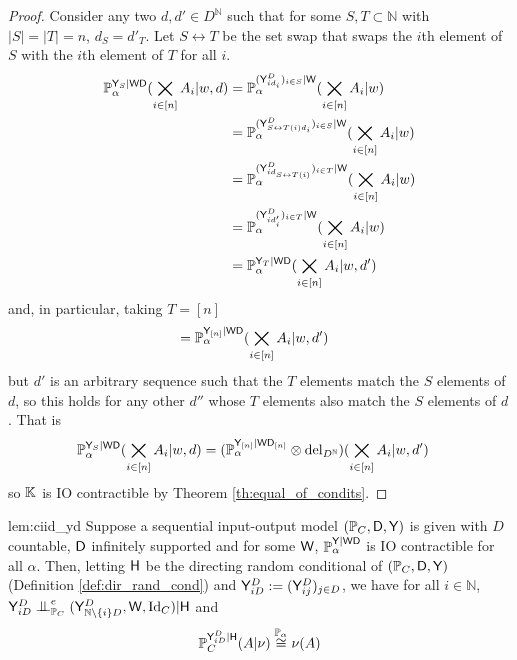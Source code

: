 \begin{proof}
Consider any two $d,d'\in D^{\mathbb{N}}$ such that for some $S,T\subset\mathbb{N}$ with $|S|=|T|=n$, $d_S=d'_T$. Let $S\leftrightarrow T$ be the set swap that swaps the $i$th element of $S$ with the $i$th element of $T$ for all $i$.
\begin{align}
    \mathbb{P}_\alpha^{\mathsf{Y}_S|\mathsf{WD}}(\bigtimes_{i\in [n]} A_i|w,d) &= \mathbb{P}_\alpha^{(\mathsf{Y}^D_{i d_i})_{i\in S}|\mathsf{W}} (\bigtimes_{i\in [n]} A_i|w)\\
    &= \mathbb{P}_\alpha^{(\mathsf{Y}^D_{S\leftrightarrow T(i) d_i})_{i\in S}|\mathsf{W}} (\bigtimes_{i\in [n]} A_i|w)\\
    &= \mathbb{P}_\alpha^{(\mathsf{Y}^D_{i d_{S\leftrightarrow T(i)}})_{i\in T}|\mathsf{W}} (\bigtimes_{i\in [n]} A_i|w)\\
    &= \mathbb{P}_\alpha^{(\mathsf{Y}^D_{i d'_{i}})_{i\in T}|\mathsf{W}} (\bigtimes_{i\in [n]} A_i|w)\\
    &=  \mathbb{P}_\alpha^{\mathsf{Y}_T|\mathsf{WD}}(\bigtimes_{i\in [n]} A_i|w,d')
\end{align}
and, in particular, taking $T=[n]$
\begin{align}
    &= \mathbb{P}_\alpha^{\mathsf{Y}_{[n]}|\mathsf{WD}} (\bigtimes_{i\in [n]} A_i|w,d')
\end{align}
but $d'$ is an arbitrary sequence such that the $T$ elements match the $S$ elements of $d$, so this holds for any other $d''$ whose $T$ elements also match the $S$ elements of $d$. That is
\begin{align}
    \mathbb{P}_\alpha^{\mathsf{Y}_S|\mathsf{WD}}(\bigtimes_{i\in [n]} A_i|w,d)&= (\mathbb{P}_\alpha^{\mathsf{Y}_{[n]}|\mathsf{WD}_{[n]}}\otimes \mathrm{del}_{D^{\mathbb{N}}}) (\bigtimes_{i\in [n]} A_i|w,d')
\end{align}
so $\mathbb{K}$ is IO contractible by Theorem \ref{th:equal_of_condits}.
\end{proof}

\begin{replemma}{lem:ciid_yd}
Suppose a sequential input-output model $(\mathbb{P}_C,\mathsf{D},\mathsf{Y})$ is given with $D$ countable, $\mathsf{D}$ infinitely supported and for some $\mathsf{W}$, $\mathbb{P}_\alpha^{\mathsf{Y}|\mathsf{WD}}$ is IO contractible for all $\alpha$. Then, letting $\mathsf{H}$ be the directing random conditional of $(\mathbb{P}_C,\mathsf{D},\mathsf{Y})$ (Definition \ref{def:dir_rand_cond}) and $\mathsf{Y}^D_{iD}:=(\mathsf{Y}^D_{ij})_{j\in D}$, we have for all $i\in\mathbb{N}$, $\RV{Y}^D_{iD}\CI^e_{\prob{P}_C} (\RV{Y}^D_{\mathbb{N}\setminus\{i\}D},\RV{W},\text{Id}_C) | \RV{H}$ and
\begin{align}
    \mathbb{P}_C^{\mathsf{Y}^D_{iD}|\mathsf{H}}(A|\nu) \overset{\mathbb{P}_\alpha}{\cong} \nu(A)
\end{align}
\end{replemma}

